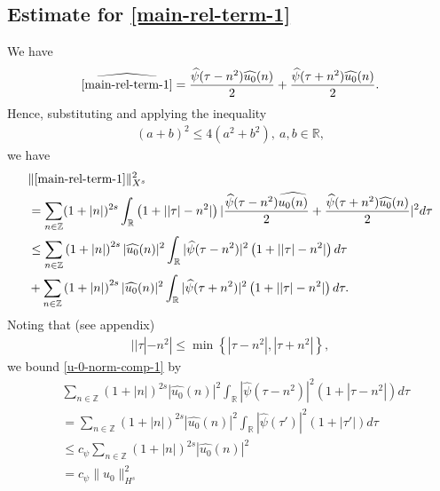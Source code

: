 \documentclass[12pt,reqno]{amsart}
\numberwithin{equation}{section}  %
\newcommand{\rr}{\mathbb{R}}
\newcommand{\zz}{\mathbb{Z}}
\newcommand{\wh}{\widehat}
\begin{document}
\subsection{Estimate for \eqref{main-rel-term-1}}
\label{ssec:est-init-term-1}
We have
%
%
\begin{equation*}
  \begin{split}
    \wh{\eqref{main-rel-term-1}}
    = \frac{\wh{\psi}(\tau -
    n^{2})\wh{u_{0}}(n)}{2} + \frac{\wh{\psi}(\tau +
    n^{2})\wh{u_{0}}(n)}{2}.
  \end{split}
\end{equation*}
%
%
Hence, substituting and applying the inequality 
%
%
\begin{equation}
  \label{square-ineq}
\begin{split}
(a + b)^{2} \le 4(a^{2} +
b^{2}),\ a, b \in \rr,
\end{split}
\end{equation}
%
%
we have
%
%
\begin{align}
  & \| \eqref{main-rel-term-1} \|_{X^{s}}^{2} 
    \notag
    \\
    & = \sum_{n \in \zz}(1 + |n|)^{2s} \int_{\rr}\left( 1 + | | \tau
    |-n^{2} | \right) | \frac{\wh{\psi}(\tau - n^{2})\wh{u_{0}(n)}}{2 } +
    \frac{\wh{\psi}(\tau + n^{2})\wh{u_{0}}(n)}{2 } |^{2} d \tau
    \notag
    \\
    & \le \sum_{n \in \zz} \left( 1 + |n| \right)^{2s} | \wh{u_{0}}(n)
    |^{2} \int_{\rr} | \wh{\psi}(\tau - n^{2}) |^{2}\left( 1 + | | \tau | -
    n^{2} | \right) d \tau
    \label{u-0-norm-comp-1}
    \\
    & + \sum_{n \in \zz} \left( 1 + |n| \right)^{2s} | \wh{u_{0}}(n)
    |^{2} \int_{\rr} | \wh{\psi}(\tau + n^{2}) |^{2}\left( 1 + | | \tau | -
    n^{2} | \right) d \tau.
    \label{u-0-norm-comp-3}
\end{align}
%
%
Noting that (see appendix)
\begin{equation}
  \begin{split}
    | | \tau | - n^{2} | \le \min\left\{ | \tau - n^{2} |, | \tau + n^{2} |
    \right\},
  \end{split}
  \label{eqn:norm-key-ineq}
\end{equation}
%
we bound \eqref{u-0-norm-comp-1} by
%
%
\begin{equation*}
  \begin{split}
    & \sum_{n \in \zz} \left( 1 + |n| \right)^{2s} | \wh{u_{0}}(n)
    |^{2} \int_{\rr} | \wh{\psi}(\tau - n^{2}) |^{2}\left( 1 +  | \tau  -
    n^{2} | \right) d \tau
    \\
    & = \sum_{n \in \zz} \left( 1 + |n| \right)^{2s} | \wh{u_{0}}(n)
    |^{2} \int_{\rr} | \wh{\psi}(\tau') |^{2}\left( 1 +  | \tau'| \right) d \tau
    \\
    & \le c_{\psi} \sum_{n \in \zz} \left( 1 + |n| \right)^{2s} | \wh{u_{0}}(n)
    |^{2}
    \\
    & = c_{\psi} \| u_{0} \|_{H^{s}}^{2}
  \end{split}
\end{equation*}
\end{document}
